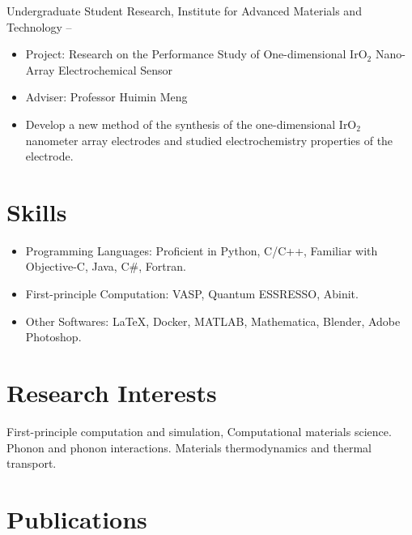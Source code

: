 \documentclass[
  a4paper,
  12pt
]{cv}
\begin{document}

\vspace{.25em}
Undergraduate Student Research, 
Institute for Advanced Materials and Technology
\hfill
{} --
\begin{itemize}
\item Project: Research on the Performance Study of One-dimensional IrO$_{2}$ Nano-Array Electrochemical Sensor
\item Adviser: Professor Huimin Meng
\item Develop a new method of the synthesis of the one-dimensional IrO$_{2}$ nanometer array electrodes and studied electrochemistry properties of the electrode.
\end{itemize}


\section{Skills}
\begin{itemize}
\item
Programming Languages:   
Proficient in
Python, C/C++, 
Familiar with Objective-C, Java, C\#, Fortran.
\item
First-principle Computation:   
VASP, Quantum ESSRESSO, Abinit.
\item
Other Softwares:    
{\LaTeX}, 
Docker,
MATLAB, 
Mathematica, 
Blender,
Adobe Photoshop.
\end{itemize}


\section{Research Interests}
First-principle computation and simulation, Computational materials science. Phonon and phonon interactions. Materials thermodynamics and thermal transport.


\section{Publications}
\end{document}
